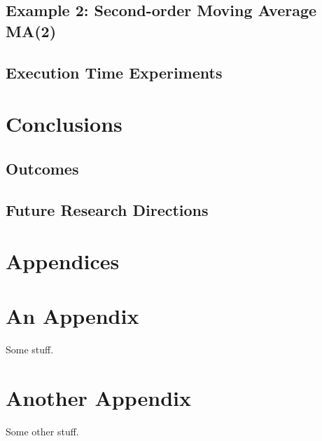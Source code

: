 \documentclass[11pt,twoside]{article}
\numberwithin{Theorem}{section}
\numberwithin{Definition}{section}
\numberwithin{Lemma}{section}
\numberwithin{Algorithm}{section}
\numberwithin{equation}{section}
\begin{document}
\subsection{Example 2: Second-order Moving Average MA(2)}
\label{subsec:ma2}


\subsection{Execution Time Experiments}
\label{subsec:exec}


\section{Conclusions}

\subsection{Outcomes}

\subsection{Future Research Directions}
\clearpage

\printbibliography
\clearpage

\appendix
\section*{Appendices}

\clearpage
\section{An Appendix}
\label{app:one}

Some stuff.
\clearpage

\section{Another Appendix}
\label{app:two}

Some other stuff.
\end{document}
